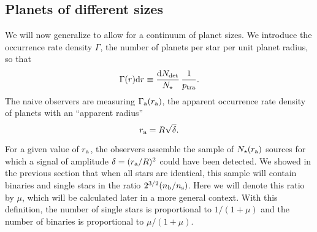 \documentclass[12pt,modern,trackchanges]{aastex61}
\renewcommand{\a}{_{\rm a}}
\newcommand{\s}{_{\rm s}}
\renewcommand{\b}{_{\rm b}}
\begin{document}
\subsection{Planets of different sizes}
\label{sec:model_1_density}

We will now generalize to allow for a continuum of planet sizes.   We
introduce the occurrence rate density $\Gamma$, the number of planets
per star per unit planet radius, so that
\begin{equation}
    \Gamma(r) {\rm d}r \equiv \frac{ {\rm d}N_{\rm det} }{N_\star}
            \, \frac{1}{p_{\rm tra}}.
    \label{eq:rate_density_defn}
\end{equation}
The naive observers are measuring $\Gamma\a(r\a)$, the apparent
occurrence rate density of planets with an ``apparent radius''
\begin{equation}
  r\a = R \sqrt{\delta}.
\end{equation}

For a given value of $r\a$, the observers assemble the sample of
$N_\star(r\a)$ sources for which a signal of amplitude $\delta =
(r\a/R)^2$ could have been detected.  We showed in the previous
section that when all stars are identical, this sample will contain
binaries and single stars in the ratio $2^{3/2}(n\b/n\s)$.  Here we
will denote this ratio by $\mu$, which will be calculated later in a
more general context.  With this definition, the number of single
stars is proportional to $1/(1+\mu)$ and the number of binaries is
proportional to $\mu/(1+\mu)$.
\end{document}
